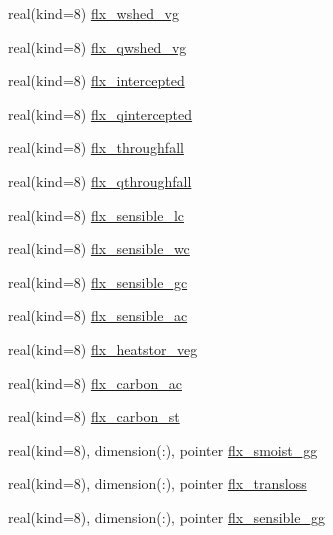 \begin{DoxyCompactItemize}
real(kind=8) \hyperlink{structrk4__coms_1_1rk4patchtype_a72aae669d1cab22883692b13247fbb1d}{flx\+\_\+wshed\+\_\+vg}
\item 
real(kind=8) \hyperlink{structrk4__coms_1_1rk4patchtype_ac22d33b9c1250638b851b383eb7f2a00}{flx\+\_\+qwshed\+\_\+vg}
\item 
real(kind=8) \hyperlink{structrk4__coms_1_1rk4patchtype_a66058856cdbc2f248eebd6f633caae6b}{flx\+\_\+intercepted}
\item 
real(kind=8) \hyperlink{structrk4__coms_1_1rk4patchtype_a96e0978ac56cff5b404b278cae2ebeeb}{flx\+\_\+qintercepted}
\item 
real(kind=8) \hyperlink{structrk4__coms_1_1rk4patchtype_a96aa55f5c97dee65099549207ad41a96}{flx\+\_\+throughfall}
\item 
real(kind=8) \hyperlink{structrk4__coms_1_1rk4patchtype_ac59d35c625dced51b4dc31bb5c99c2e8}{flx\+\_\+qthroughfall}
\item 
real(kind=8) \hyperlink{structrk4__coms_1_1rk4patchtype_a91231e44502f9d26fe8950c128fbf3b4}{flx\+\_\+sensible\+\_\+lc}
\item 
real(kind=8) \hyperlink{structrk4__coms_1_1rk4patchtype_a9a2066494f7de002d7e86be57a903d06}{flx\+\_\+sensible\+\_\+wc}
\item 
real(kind=8) \hyperlink{structrk4__coms_1_1rk4patchtype_a878de75c1a4fa1dd80bbdda3f7320b6a}{flx\+\_\+sensible\+\_\+gc}
\item 
real(kind=8) \hyperlink{structrk4__coms_1_1rk4patchtype_ac4ba0b1904aeb8cb29dc5fd2faff693f}{flx\+\_\+sensible\+\_\+ac}
\item 
real(kind=8) \hyperlink{structrk4__coms_1_1rk4patchtype_acda7fd7edfd45e19f5019eb3d3a876c7}{flx\+\_\+heatstor\+\_\+veg}
\item 
real(kind=8) \hyperlink{structrk4__coms_1_1rk4patchtype_ac17d65cfb6aba2b49aa0111ebd481ff8}{flx\+\_\+carbon\+\_\+ac}
\item 
real(kind=8) \hyperlink{structrk4__coms_1_1rk4patchtype_aaac4b941f5219cb09fcee913df1fe758}{flx\+\_\+carbon\+\_\+st}
\item 
real(kind=8), dimension(\+:), pointer \hyperlink{structrk4__coms_1_1rk4patchtype_acae044de6672ba5a46cd05ddbe6a6d3a}{flx\+\_\+smoist\+\_\+gg}
\item 
real(kind=8), dimension(\+:), pointer \hyperlink{structrk4__coms_1_1rk4patchtype_a05bd91d33a629d7009312ebacc30835f}{flx\+\_\+transloss}
\item 
real(kind=8), dimension(\+:), pointer \hyperlink{structrk4__coms_1_1rk4patchtype_acd6dcbc62beb64e22a4d5f12090c2038}{flx\+\_\+sensible\+\_\+gg}

\end{DoxyCompactItemize}
